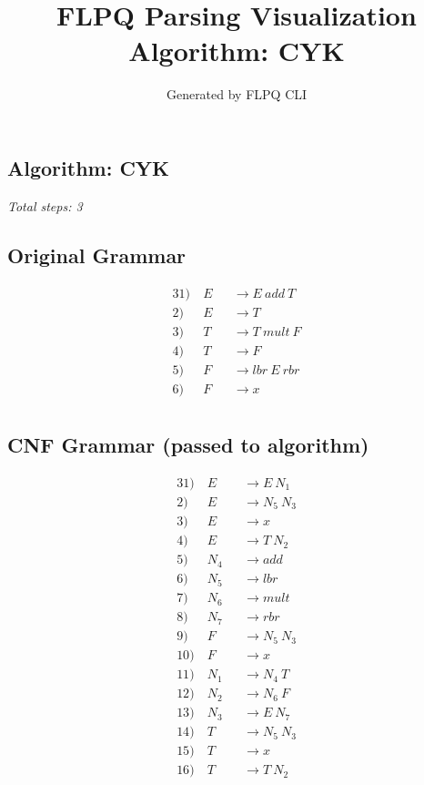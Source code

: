\documentclass[12pt]{article}
\title{FLPQ Parsing Visualization\\Algorithm: CYK}
\author{Generated by FLPQ CLI}
\date{}
\begin{document}
\maketitle
\tableofcontents

\subsection*{Algorithm: CYK}
\textit{Total steps: 3}\\

\subsection*{Original Grammar}
\begin{center}
\begin{alignat*}{3}
1) \ & E &&\rightarrow E\ add\ T \\
2) \ & E &&\rightarrow T \\
3) \ & T &&\rightarrow T\ mult\ F \\
4) \ & T &&\rightarrow F \\
5) \ & F &&\rightarrow lbr\ E\ rbr \\
6) \ & F &&\rightarrow x \\
\end{alignat*}
\end{center}

\subsection*{CNF Grammar (passed to algorithm)}
\begin{center}
\begin{alignat*}{3}
1) \ & E &&\rightarrow E\ N_1 \\
2) \ & E &&\rightarrow N_5\ N_3 \\
3) \ & E &&\rightarrow x \\
4) \ & E &&\rightarrow T\ N_2 \\
5) \ & N_4 &&\rightarrow add \\
6) \ & N_5 &&\rightarrow lbr \\
7) \ & N_6 &&\rightarrow mult \\
8) \ & N_7 &&\rightarrow rbr \\
9) \ & F &&\rightarrow N_5\ N_3 \\
10) \ & F &&\rightarrow x \\
11) \ & N_1 &&\rightarrow N_4\ T \\
12) \ & N_2 &&\rightarrow N_6\ F \\
13) \ & N_3 &&\rightarrow E\ N_7 \\
14) \ & T &&\rightarrow N_5\ N_3 \\
15) \ & T &&\rightarrow x \\
16) \ & T &&\rightarrow T\ N_2 \\
\end{alignat*}
\end{center}
\end{document}
